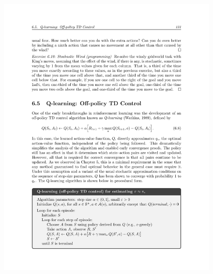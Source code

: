 \begin{figure}[h!]
  \center
\includegraphics[width=\linewidth]{figures/qlearning.pdf}
\end{figure}



